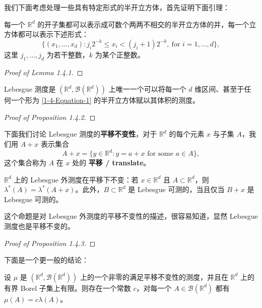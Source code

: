 \documentclass[11pt]{article}
\newcommand{\RR}{\mathbb{R}}
\newcommand{\calB}{\mathcal{B}}
\begin{document}
我们下面考虑处理一些具有特定形式的半开立方体，首先证明下面引理：

\begin{lemma}\label{Lemma-1-4-1}
    每一个 $\RR^d$ 的开子集都可以表示成可数个两两不相交的半开立方体的并，每一个立方体都可以表示下述形式：
    \begin{equation}\label{1-4-Equation-1}
        \{(x_1,\dots,x_d) : j_i 2^{-k} \le x_i < (j_i+1)2^{-k},\ \text{for } i=1,\dots,d\},
    \end{equation}
    这里 $j_1,\dots,j_d$ 为若干整数，$k$ 为某个正整数。
\end{lemma}

\begin{proof}[Proof of Lemma 1.4.1]
\end{proof}

\begin{proposition}\label{Proposition-1-4-2}
    Lebesgue 测度是 $(\RR^d,\calB(\RR^d))$ 上唯一一个可以将每一个 $d$ 维区间、甚至于任何一个形为 \eqref{1-4-Equation-1} 的半开立方体赋以其体积的测度。
\end{proposition}

\begin{proof}[Proof of Proposition 1.4.2]
\end{proof}

下面我们讨论 Lebesgue 测度的{\normalfont\bfseries 平移不变性}，对于 $\RR^d$ 的每个元素 $x$ 与子集 $A$，我们用 $A+x$ 表示集合
\[
    A+x = \{y \in \RR^d : y = a+x \text{ for some } a \in A\},
\]
这个集合称为 $A$ 在 $x$ 处的 {\normalfont\bfseries 平移 / translate}。

\begin{proposition}\label{Proposition-1-4-3}
    $\RR^d$ 上的 Lebesgue 外测度在平移下不变：若 $x \in \RR^d$ 且 $A \subset \RR^d$，则 $\lambda^*(A) = \lambda^*(A+x)$。此外，$B \subset \RR^d$ 是 Lebesgue 可测的，当且仅当 $B+x$ 是 Lebesgue 可测的。
\end{proposition}

这个命题是对 Lebesgue 外测度的平移不变性的描述，很容易知道，显然 Lebesgue 测度也是平移不变的。

\begin{proof}[Proof of Proposition 1.4.3]
\end{proof}

下面是一个更一般的结论：

\begin{proposition}\label{Proposition-1-4-4}
    设 $\mu$ 是 $(\RR^d,\calB(\RR^d))$ 上的一个非零的满足平移不变性的测度，并且在 $\RR^d$ 上的有界 Borel 子集上有限。则存在一个常数 $c$，对每一个 $A \in \calB(\RR^d)$ 都有 $\mu(A) = c\lambda(A)$。
\end{proposition}
\end{document}
